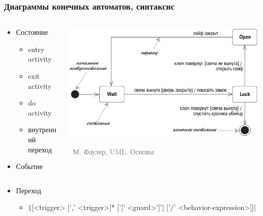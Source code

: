 \documentclass[xetex,mathserif,serif]{beamer}
\newcommand{\attribution}[1] {
	\vspace{-5mm}\begin{flushright}\begin{scriptsize}\textcolor{gray}{\textcopyright\, #1}\end{scriptsize}\end{flushright}
}
\begin{document}
	\begin{frame}
		\frametitle{Диаграммы конечных автоматов, синтаксис}
		\begin{columns}
			\begin{column}{0.5\textwidth}
				\begin{itemize}
					\item Состояние
					\begin{itemize}
						\item entry activity
						\item exit activity
						\item do activity
						\item внутренний переход
					\end{itemize}
					\item Событие
				\end{itemize}
			\end{column}
			\begin{column}{0.5\textwidth}
				\begin{center}
					\includegraphics[width=\textwidth]{stateTransitionSyntax.png}
					\attribution{М. Фаулер, UML. Основы}
				\end{center}
			\end{column}
		\end{columns}
		\begin{itemize}
			\item Переход
			\begin{itemize}
				\item \texttt|[<trigger> [',' <trigger>]* ['[' <guard>']'] ['/' <behavior-expression>]]|
			\end{itemize}
		\end{itemize}
	\end{frame}
\end{document}
